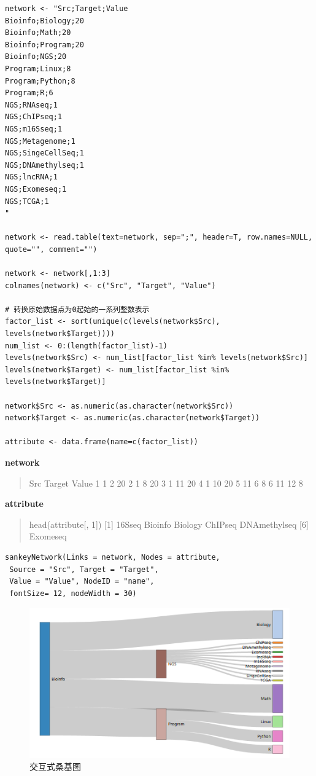 \documentclass[]{article}
\numberwithin{figure}{section}
\numberwithin{table}{section}
\theoremstyle{definition}
\theoremstyle{definition}
\theoremstyle{definition}
\theoremstyle{remark}
\begin{document}
\begin{verbatim}
network <- "Src;Target;Value
Bioinfo;Biology;20
Bioinfo;Math;20
Bioinfo;Program;20
Bioinfo;NGS;20
Program;Linux;8
Program;Python;8
Program;R;6
NGS;RNAseq;1
NGS;ChIPseq;1
NGS;m16Sseq;1
NGS;Metagenome;1
NGS;SingeCellSeq;1
NGS;DNAmethylseq;1
NGS;lncRNA;1
NGS;Exomeseq;1
NGS;TCGA;1
"

network <- read.table(text=network, sep=";", header=T, row.names=NULL, quote="", comment="")

network <- network[,1:3]
colnames(network) <- c("Src", "Target", "Value")

# 转换原始数据点为0起始的一系列整数表示
factor_list <- sort(unique(c(levels(network$Src), levels(network$Target))))
num_list <- 0:(length(factor_list)-1)
levels(network$Src) <- num_list[factor_list %in% levels(network$Src)]
levels(network$Target) <- num_list[factor_list %in% levels(network$Target)]

network$Src <- as.numeric(as.character(network$Src))
network$Target <- as.numeric(as.character(network$Target))

attribute <- data.frame(name=c(factor_list))
\end{verbatim}

\textbf{network}

\begin{quote}
Src Target Value 1 1 2 20 2 1 8 20 3 1 11 20 4 1 10 20 5 11 6 8 6 11 12
8
\end{quote}

\textbf{attribute}

\begin{quote}
head(attribute{[}, 1{]}) {[}1{]} 16Sseq Bioinfo Biology ChIPseq
DNAmethylseq {[}6{]} Exomeseq
\end{quote}

\begin{verbatim}
sankeyNetwork(Links = network, Nodes = attribute,
 Source = "Src", Target = "Target",
 Value = "Value", NodeID = "name",
 fontSize= 12, nodeWidth = 30)
\end{verbatim}

\begin{figure}[H]

{\centering \includegraphics[width=0.95\linewidth,height=0.7\textheight,keepaspectratio]{images/Sanky_train1} 

}

\caption{交互式桑基图}\label{fig:unnamed-chunk-239}
\end{figure}
\end{document}

